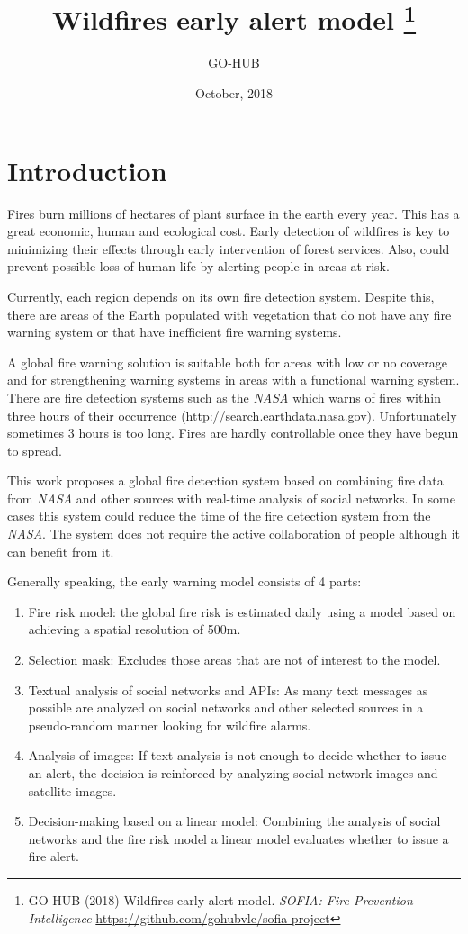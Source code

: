 \documentclass{article}
\title{Wildfires early alert model \footnote{ GO-HUB (2018) Wildfires early alert model. \textit{SOFIA: Fire Prevention Intelligence} \url{https://github.com/gohubvlc/sofia-project}}}
\date{October, 2018}
\author{GO-HUB}
\begin{document}
\maketitle


\section{Introduction}

Fires burn millions of hectares of plant surface in the earth every year.
This has a great economic, human and ecological cost.
Early detection of wildfires is key to minimizing their effects through early intervention of forest services.
Also, could prevent possible loss of human life by alerting people in areas at risk.

Currently, each region depends on its own fire detection system.
Despite this, there are areas of the Earth populated with vegetation that do not have any fire warning system or that have inefficient fire warning systems.

A global fire warning solution is suitable both for areas with low or no coverage and for strengthening warning systems in areas with a functional warning system.
There are fire detection systems such as the \textit{NASA} which warns of fires within three hours of their occurrence (\url{http://search.earthdata.nasa.gov}).
Unfortunately sometimes 3 hours is too long.
Fires are hardly controllable once they have begun to spread.

This work proposes a global fire detection system based on combining fire data from \textit{NASA} and other sources with real-time analysis of social networks.
In some cases this system could reduce the time of the fire detection system from the \textit{NASA}.
The system does not require the active collaboration of people although it can benefit from it.

Generally speaking, the early warning model consists of 4 parts:
\begin{enumerate}
\item Fire risk model:
	the global fire risk is estimated daily using a model based on \cite{chowdhury2015development} achieving a spatial resolution of 500m.
\item Selection mask:
	Excludes those areas that are not of interest to the model.
\item Textual analysis of social networks and APIs:
	As many text messages as possible are analyzed on social networks and other selected sources in a pseudo-random manner looking for wildfire alarms.
\item Analysis of images:
	If text analysis is not enough to decide whether to issue an alert, the decision is reinforced by analyzing social network images and satellite images.
\item Decision-making based on a linear model:
	Combining the analysis of social networks and the fire risk model a linear model evaluates whether to issue a fire alert.

\end{enumerate}
\end{document}
